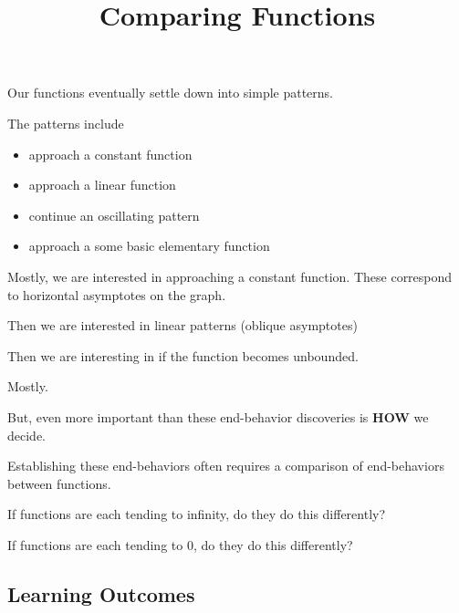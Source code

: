 \documentclass{ximera}
\title{Comparing Functions}
\begin{document}
\begin{abstract}
\end{abstract}
\maketitle







Our functions eventually settle down into simple patterns.  

The patterns include

\begin{itemize}
\item approach a constant function
\item approach a linear function
\item continue an oscillating pattern
\item approach a some basic elementary function 
\end{itemize}


Mostly, we are interested in approaching a constant function.  These correspond to horizontal asymptotes on the graph.

Then we are interested in linear patterns (oblique asymptotes)

Then we are interesting in if the function becomes unbounded.

Mostly.


But, even more important than these end-behavior discoveries is \textbf{HOW} we decide.

Establishing these end-behaviors often requires a comparison of end-behaviors between functions.  


If functions are each tending to infinity, do they do this differently?


If functions are each tending to $0$, do they do this differently?















\subsection{Learning Outcomes}
\end{document}
